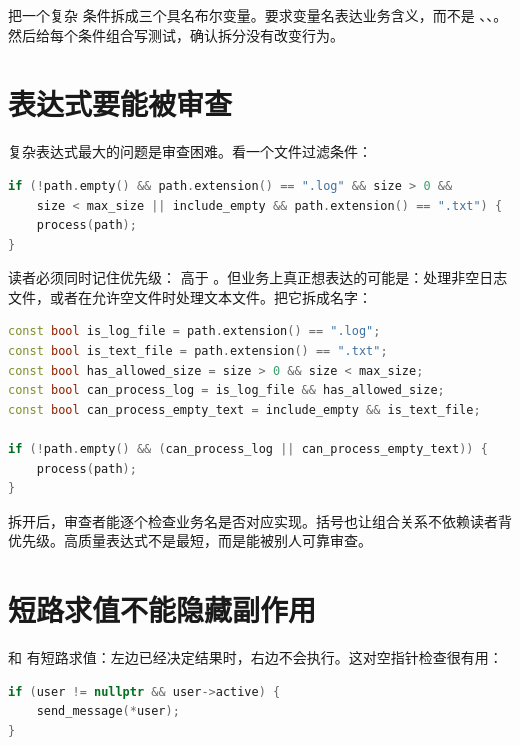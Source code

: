 \begin{exercisebox}
把一个复杂  条件拆成三个具名布尔变量。要求变量名表达业务含义，而不是 、、。然后给每个条件组合写测试，确认拆分没有改变行为。
\end{exercisebox}

\section{表达式要能被审查}

复杂表达式最大的问题是审查困难。看一个文件过滤条件：

\begin{lstlisting}[language=C++,caption={难以审查的文件过滤条件}]
if (!path.empty() && path.extension() == ".log" && size > 0 &&
    size < max_size || include_empty && path.extension() == ".txt") {
    process(path);
}
\end{lstlisting}

读者必须同时记住优先级：\code{&&} 高于 \code{||}。但业务上真正想表达的可能是：处理非空日志文件，或者在允许空文件时处理文本文件。把它拆成名字：

\begin{lstlisting}[language=C++,caption={用名字表达业务条件}]
const bool is_log_file = path.extension() == ".log";
const bool is_text_file = path.extension() == ".txt";
const bool has_allowed_size = size > 0 && size < max_size;
const bool can_process_log = is_log_file && has_allowed_size;
const bool can_process_empty_text = include_empty && is_text_file;

if (!path.empty() && (can_process_log || can_process_empty_text)) {
    process(path);
}
\end{lstlisting}

拆开后，审查者能逐个检查业务名是否对应实现。括号也让组合关系不依赖读者背优先级。高质量表达式不是最短，而是能被别人可靠审查。

\section{短路求值不能隐藏副作用}

\code{&&} 和 \code{||} 有短路求值：左边已经决定结果时，右边不会执行。这对空指针检查很有用：

\begin{lstlisting}[language=C++,caption={短路保护指针解引用}]
if (user != nullptr && user->active) {
    send_message(*user);
}
\end{lstlisting}

